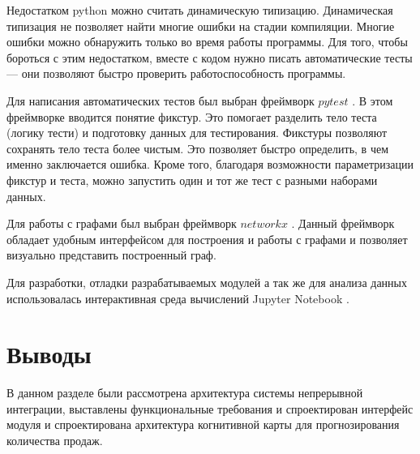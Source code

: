 Недостатком python можно считать динамическую типизацию. Динамическая типизация не позволяет
найти многие ошибки на стадии компиляции. Многие ошибки можно обнаружить только во время
работы программы. Для того, чтобы бороться с этим недостатком, вместе с кодом нужно писать
автоматические тесты --- они позволяют быстро проверить работоспособность программы.

Для написания автоматических тестов был выбран фреймворк $ pytest $ \cite{pytestx.y}. В этом фреймворке
вводится понятие фикстур. Это помогает разделить тело теста (логику тести) и
подготовку данных для тестирования. Фикстуры позволяют сохранять тело
теста более чистым. Это позволяет быстро определить, в чем именно заключается ошибка.
Кроме того, благодаря возможности параметризации фикстур и теста, можно
запустить один и тот же тест с разными наборами данных.

Для работы с графами был выбран фреймворк $ networkx $ \cite{hagberg-2008-exploring}. Данный фреймворк
обладает удобным интерфейсом для построения и работы с графами и
позволяет визуально представить построенный граф.

Для разработки, отладки разрабатываемых модулей а так же для
анализа данных использовалась интерактивная среда вычислений Jupyter Notebook \cite{Kluyver:2016aa}.


\section{Выводы}

В данном разделе были рассмотрена архитектура системы
непрерывной интеграции, выставлены функциональные требования
и спроектирован интерфейс модуля и спроектирована архитектура
когнитивной карты для прогнозирования количества продаж.